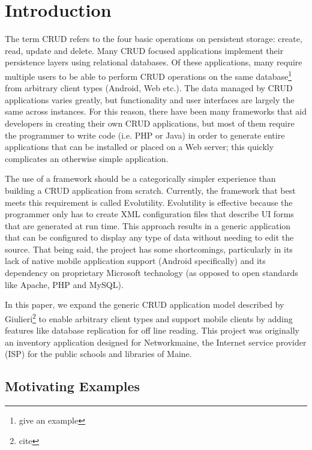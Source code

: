 \section{Introduction} \label{sec:intro}


The term CRUD refers to the four basic operations on persistent storage: create,
read, update and delete. Many CRUD focused applications implement their
persistence layers using relational databases. Of these applications, many
require multiple users to be able to perform CRUD operations on the same
database\footnote{give an example} from arbitrary client types (Android, Web
etc.). The data managed by CRUD applications varies greatly, but functionality
and user interfaces are largely the same across instances. For this reason,
there have been many frameworks that aid developers in creating their own CRUD
applications, but most of them require the programmer to write code (i.e. PHP or
Java) in order to generate entire applications that can be installed or placed
on a Web server; this quickly complicates an otherwise simple application. 

The use of a framework should be a categorically simpler experience than
building a CRUD application from scratch. Currently, the framework that best
meets this requirement is called Evolutility. Evolutility
is effective because the programmer only has to create XML configuration files
that describe UI forms that are generated at run time. This approach results in
a generic application that can be configured to display any type of data without
needing to edit the source. That being said, the project has some shortcomings,
particularly in its lack of native mobile application support (Android
specifically) and its dependency on proprietary Microsoft technology (as opposed
to open standards like Apache, PHP and MySQL). 

In this paper, we expand the generic CRUD application model described by
Giulieri\footnote{cite} to enable arbitrary client types and support mobile
clients by adding features like database replication for off line reading. This
project was originally an inventory application designed for Networkmaine, the
Internet service provider (ISP) for the public schools and libraries of Maine.


\subsection{Motivating Examples} \label{sec:motivation}

